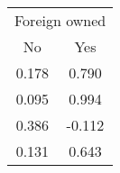 \begin{tabular}{cc}
\toprule
\multicolumn{2}{c}{Foreign owned} \\
\cmidrule(lr){1-2}
No & Yes \\
\midrule
0.178 & 0.790 \\
0.095 & 0.994 \\
0.386 & -0.112 \\
0.131 & 0.643 \\
\bottomrule
\end{tabular}
